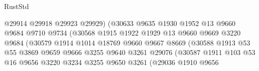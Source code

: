 \begin{lexlean}{RustStd}
\begin{coremodule}
                                      @29914
                                      @29918
                                      @29923
                                      @29929)
                                    (@30633
                                      @9635
                                      @1930
                                      @1952
                                      @13
                                      @9660
                                      @9684
                                      @9710
                                      @9734
                                      (@30568
                                        @1915
                                        @1922
                                        @1929
                                        @13
                                        @9660
                                        @9669
                                        @3220
                                        @9684
                                        (@30579
                                          @1914
                                          @1014
                                          @18769
                                          @9660
                                          @9667
                                          @8669
                                          (@30588
                                            @1913
                                            @53
                                            @55
                                            @3869
                                            @9659
                                            @9666
                                            @3255
                                            @9640
                                            @3261
                                            @29076
                                            (@30587
                                              @1911
                                              @103
                                              @53
                                              @16
                                              @9656
                                              @3220
                                              @3234
                                              @3255
                                              @9650
                                              @3261
                                              (@29036
                                                @1910
                                                @9656

\end{coremodule}
\end{lexlean}
